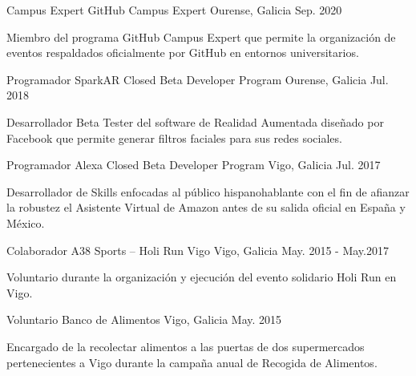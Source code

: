 \documentclass[11pt, a4paper]{style}
\begin{document}
\begin{cventries}
  \cventry
    {Campus Expert} %
    {GitHub Campus Expert} %
    {Ourense, Galicia} %
    {Sep. 2020} %
    {
      \begin{cvitems} %
        \item {Miembro del programa GitHub Campus Expert que permite la organización de eventos respaldados oficialmente por GitHub en entornos universitarios.}
      \end{cvitems}
    }
  \cventry
    {Programador} %
    {SparkAR Closed Beta Developer Program} %
    {Ourense, Galicia} %
    {Jul. 2018} %
    {
      \begin{cvitems} %
        \item {Desarrollador Beta Tester del software de Realidad Aumentada diseñado por Facebook que permite generar filtros faciales para sus redes sociales.}
      \end{cvitems}
    }
  \cventry
    {Programador} %
    {Alexa Closed Beta Developer Program} %
    {Vigo, Galicia} %
    {Jul. 2017} %
    {
      \begin{cvitems} %
        \item {Desarrollador de Skills enfocadas al público hispanohablante con el fin de afianzar la robustez el Asistente Virtual de Amazon antes de su salida oficial en España y México.}
      \end{cvitems}
    }
  \cventry
    {Colaborador} %
    {A38 Sports – Holi Run Vigo} %
    {Vigo, Galicia} %
    {May. 2015 - May.2017} %
    {
      \begin{cvitems} %
        \item {Voluntario durante la organización y ejecución del evento solidario Holi Run en Vigo.}
      \end{cvitems}
    }
  \cventry
    {Voluntario} %
    {Banco de Alimentos} %
    {Vigo, Galicia} %
    {May. 2015} %
    {
      \begin{cvitems} %
        \item {Encargado de la recolectar alimentos a las puertas de dos supermercados pertenecientes a Vigo durante la campaña anual de Recogida de Alimentos.}
      \end{cvitems}
    }
\end{cventries}
\end{document}
